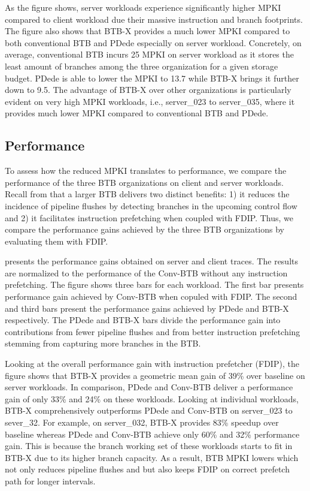As the figure shows, server workloads experience significantly higher MPKI compared to client workload due their massive instruction and branch footprints. The figure also shows that BTB-X provides a much lower MPKI compared to both conventional BTB and PDede especially on server workload. Concretely, on average, conventional BTB incurs 25 MPKI on server workload as it stores the least amount of branches among the three organization for a given storage budget. PDede is able to lower the MPKI to 13.7 while BTB-X brings it further down to 9.5. The advantage of BTB-X over other organizations is particularly evident on very high MPKI workloads, i.e., server\_023 to server\_035, where it provides much lower MPKI compared to conventional BTB and PDede.

\subsection{Performance}
\label{hpca:sec:perfAll}

To assess how the reduced MPKI translates to performance, we compare the performance of the three BTB organizations on client and server workloads. Recall from  that a larger BTB delivers two distinct benefits: 1) it reduces the incidence of pipeline flushes by detecting branches in the upcoming control flow and 2) it facilitates instruction prefetching when coupled with FDIP. Thus, we compare the performance gains achieved by the three BTB organizations by evaluating them with FDIP.

 presents the performance gains obtained on server and client traces. The results are normalized to the performance of the Conv-BTB without any instruction prefetching. The figure shows three bars for each workload. The first bar presents performance gain achieved by Conv-BTB when copuled with FDIP. The second and third bars present the performance gains achieved by PDede and BTB-X respectively. The PDede and BTB-X bars divide the performance gain into contributions from fewer pipeline flushes and from better instruction prefetching stemming from capturing more branches in the BTB.

Looking at the overall performance gain with instruction prefetcher (FDIP), the figure shows that BTB-X provides a geometric mean gain of 39\% over baseline on server workloads. In comparison, PDede and Conv-BTB deliver a performance gain of only 33\% and 24\% on these workloads. Looking at individual workloads, BTB-X comprehensively outperforms PDede and Conv-BTB on server\_023 to sever\_32. For example, on server\_032, BTB-X provides 83\% speedup over baseline whereas PDede and Conv-BTB achieve only 60\% and 32\% performance gain. This is because the branch working set of these workloads starts to fit in BTB-X due to its higher branch capacity. As a result, BTB MPKI lowers which not only reduces pipeline flushes and but also keeps FDIP on correct prefetch path for longer intervals.

